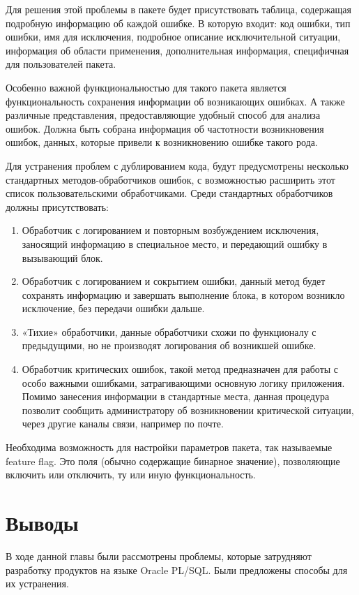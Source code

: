Для решения этой проблемы в пакете будет присутствовать таблица, содержащая подробную информацию об каждой ошибке. В которую входит: код ошибки, тип ошибки, имя для исключения, подробное описание исключительной ситуации, информация об области применения, дополнительная информация, специфичная для пользователей пакета. 

Особенно важной функциональностью для такого пакета является функциональность сохранения информации об возникающих ошибках. А также различные представления, предоставляющие удобный способ для анализа ошибок. Должна быть собрана информация об частотности возникновения ошибок, данных, которые привели к возникновению ошибке такого рода. 

Для устранения проблем с дублированием кода, будут предусмотрены несколько стандартных методов-обработчиков ошибок, с возможностью расширить этот список пользовательскими обработчиками. Среди стандартных обработчиков должны присутствовать:

\begin{enumerate}
\item Обработчик с логированием и повторным возбуждением исключения, заносящий информацию в специальное место, и передающий ошибку в вызывающий блок. 
\item Обработчик с логированием и сокрытием ошибки, данный метод будет сохранять информацию и завершать выполнение блока, в котором возникло исключение, без передачи ошибки дальше. 
\item «Тихие» обработчики, данные обработчики схожи по функционалу с предыдущими, но не производят логирования об возникшей ошибке. 
\item Обработчик критических ошибок, такой метод предназначен для работы с особо важными ошибками, затрагивающими основную логику приложения. Помимо занесения информации в стандартные места, данная процедура позволит сообщить администратору об возникновении критической ситуации, через другие каналы связи, например по почте. 
\end{enumerate} 


Необходима возможность для настройки параметров пакета, так называемые feature flag. Это поля (обычно содержащие бинарное значение), позволяющие включить или отключить, ту или иную функциональность. 

\section{Выводы} \label{ch2:conclusion}
В ходе данной главы были рассмотрены проблемы, которые затрудняют разработку продуктов на языке Oracle PL/SQL. Были предложены способы для их устранения.

